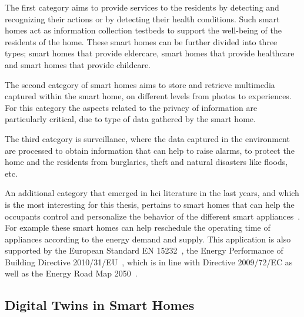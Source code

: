 The first category aims to provide services to the residents by detecting and recognizing their actions or by detecting their health conditions. Such smart homes act as information collection testbeds to support the well-being of the residents of the home. These smart homes can be further divided into three types; smart homes that provide eldercare, smart homes that provide healthcare and smart homes that provide childcare.

The second category of smart homes aims to store and retrieve multimedia captured within the smart home, on different levels from photos to experiences.  For this category the aspects related to the privacy of information are particularly critical, due to type of data gathered by the smart home.

The third category is surveillance, where the data captured in the environment are processed to obtain information that can help to raise alarms, to protect the home and the residents from burglaries, theft and natural disasters like floods, etc.

An additional category that emerged in \acrfull{hci} literature in the last years, and which is the most interesting for this thesis, pertains to smart homes that can help the occupants control and personalize the behavior of the different smart appliances~\parencite{desilvaStateArtSmart2012,lobaccaroReviewSystemsTechnologies2016}. For example these smart homes can help reschedule the operating time of appliances according to the energy demand and supply. This application is also supported by the European Standard EN 15232~\parencite{comiteeuropeendenormalisationEnergyPerformanceBuildings2012}, the Energy Performance of Building Directive 2010/31/EU~\parencite{europeanparliamentDirectiveEU20182018}, which is in line with Directive 2009/72/EC as well as the Energy Road Map 2050~\parencite{europeanclimatefoundationEnergyRoadmap20502011}.

\subsection{Digital Twins in Smart Homes}

